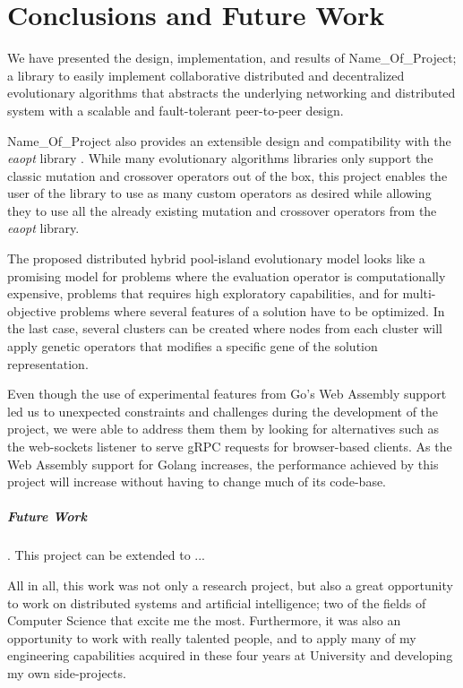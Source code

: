 \chapter{Conclusions and Future Work}

We have presented the design, implementation, and results of Name\_Of\_Project; a library to easily implement collaborative distributed and decentralized evolutionary algorithms that abstracts the underlying networking and distributed system with a scalable and fault-tolerant peer-to-peer design.

Name\_Of\_Project also provides an extensible design and compatibility with the \textit{eaopt} library \cite{eaopt}. While many evolutionary algorithms libraries only support the classic mutation and crossover operators out of the box, this project enables the user of the library to use as many custom operators as desired while allowing they to use all the already existing mutation and crossover operators from the \textit{eaopt} library.

The proposed distributed hybrid pool-island evolutionary model looks like a promising model for problems where the evaluation operator is computationally expensive, problems that requires high exploratory capabilities, and for multi-objective problems where several features of a solution have to be optimized. In the last case, several clusters can be created where nodes from each cluster will apply genetic operators that modifies a specific gene of the solution representation.

Even though the use of experimental features from Go's Web Assembly support led us to unexpected constraints and challenges during the development of the project, we were able to address them them by looking for alternatives such as the web-sockets listener to serve gRPC requests for browser-based clients. As the Web Assembly support for Golang increases, the performance achieved by this project will increase without having to change much of its code-base.



\paragraph*{Future Work}. This project can be extended to ...



All in all, this work was not only a research project, but also a great opportunity to work on distributed systems and artificial intelligence; two of the fields of Computer Science that excite me the most. Furthermore, it was also an opportunity to work with really talented people, and to apply many of my engineering capabilities acquired in these four years at University and developing my own side-projects.